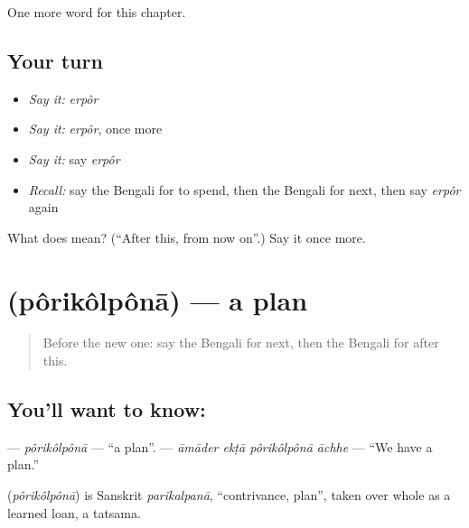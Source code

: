 \begin{grammarlens}[title={What you've built}]
One more word for this chapter.
\end{grammarlens}

\subsection*{Your turn}
\begin{itemize}
\raggedright
  \item \emph{Say it:} \emph{erpôr}
  \item \emph{Say it:} \emph{erpôr}, once more
  \item \emph{Say it:} say \emph{erpôr}
  \item \emph{Recall:} say the Bengali for to spend, then the Bengali for next, then say \emph{erpôr} again
\end{itemize}

\begin{tcolorbox}[breakable,colback=teal!4,colframe=teal!35!black,title={Before you move on}]
What does  mean? (\textquotedblleft{}After this, from now on\textquotedblright{}.) Say it once more.
\end{tcolorbox}
\section[\texorpdfstring{\bn{পরিকল্পনা} (pôrikôlpônā)}{পরিকল্পনা (pôrikôlpônā)}]{ (pôrikôlpônā) — a plan}

\label{lesson:BN-C146-porikolpona}



\begin{quote}
Before the new one: say the Bengali for next, then the Bengali for after this.
\end{quote}

\subsection*{You'll want to know: }
\textbf{} — \emph{pôrikôlpônā} — \textquotedblleft{}a plan\textquotedblright{}. \textbf{   } — \emph{āmāder ekṭā pôrikôlpônā āchhe} — \textquotedblleft{}We have a plan.\textquotedblright{}

\begin{cousinweb}
\textbf{} (\emph{pôrikôlpônā}) is Sanskrit \emph{parikalpanā}, \textquotedblleft{}contrivance, plan\textquotedblright{}, taken over whole as a learned loan, a tatsama.
\end{cousinweb}

